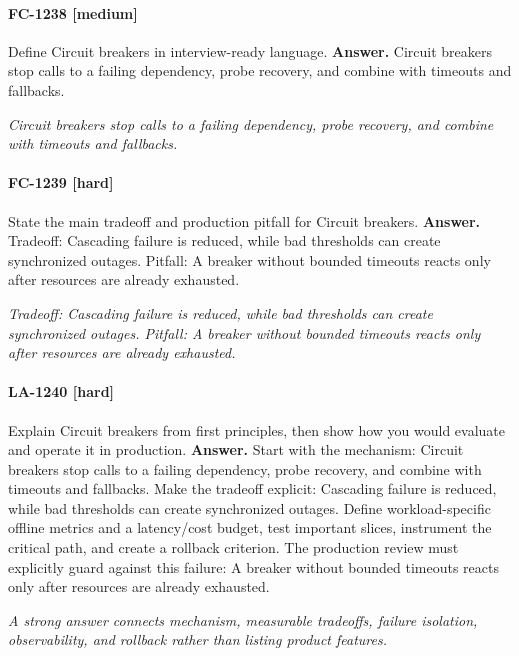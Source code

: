 \paragraph{FC-1238 [medium]} Define Circuit breakers in interview-ready language.
\noindent\textbf{Answer.} Circuit breakers stop calls to a failing dependency, probe recovery, and combine with timeouts and fallbacks.
\par\textit{Circuit breakers stop calls to a failing dependency, probe recovery, and combine with timeouts and fallbacks.}
\paragraph{FC-1239 [hard]} State the main tradeoff and production pitfall for Circuit breakers.
\noindent\textbf{Answer.} Tradeoff: Cascading failure is reduced, while bad thresholds can create synchronized outages. Pitfall: A breaker without bounded timeouts reacts only after resources are already exhausted.
\par\textit{Tradeoff: Cascading failure is reduced, while bad thresholds can create synchronized outages. Pitfall: A breaker without bounded timeouts reacts only after resources are already exhausted.}
\paragraph{LA-1240 [hard]} Explain Circuit breakers from first principles, then show how you would evaluate and operate it in production.
\noindent\textbf{Answer.} Start with the mechanism: Circuit breakers stop calls to a failing dependency, probe recovery, and combine with timeouts and fallbacks. Make the tradeoff explicit: Cascading failure is reduced, while bad thresholds can create synchronized outages. Define workload-specific offline metrics and a latency/cost budget, test important slices, instrument the critical path, and create a rollback criterion. The production review must explicitly guard against this failure: A breaker without bounded timeouts reacts only after resources are already exhausted.
\par\textit{A strong answer connects mechanism, measurable tradeoffs, failure isolation, observability, and rollback rather than listing product features.}
